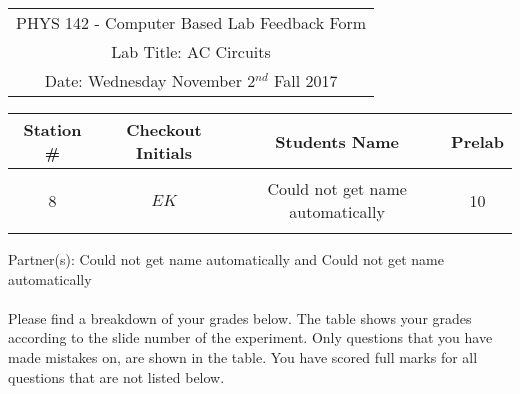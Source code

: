 \documentclass{article}
\begin{document}

\clearpage\clearpage\begin{table}[h]
	\centering
	\begin{tabular}{c}
	PHYS 142 - Computer Based Lab Feedback Form\\
	Lab Title: AC Circuits\\Date: Wednesday November 2$^{nd}$ Fall 2017 \\\hline
\end{tabular}
\end{table}
\begin{table}[h]\centering \begin{tabular}{|c|c|p{9.9 cm}|c|}\hline Station \#  & Checkout Initials & \multicolumn{1}{|c|}{Students Name} & Prelab \\\hline\multirow{3}{*}{8}& \multirow{3}{*}{$EK$} & &\\& &\multicolumn{1}{|c|}{Could not get name automatically}&10\\&   &  &\\\hline
\end{tabular}
\end{table}
Partner(s): Could not get name automatically and Could not get name automatically\\
\\Please find a breakdown of your grades below. The table shows your grades according to the slide number of the experiment. Only questions that you have made mistakes on, are shown in the table. You have scored full marks for all questions that are not listed below.
\end{document}
